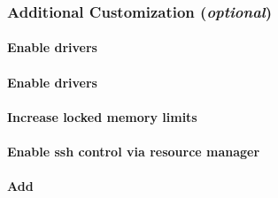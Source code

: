 \documentclass[letterpaper]{article}
\begin{document}



\subsubsection{Additional Customization ({\em optional})} \label{sec:addl_customizations}


\paragraph{Enable \InfiniBand{} drivers}


\paragraph{Enable \OmniPath{} drivers}


\paragraph{Increase locked memory limits}
 

\paragraph{Enable ssh control via resource manager} 


\vspace*{0.5cm}
\paragraph{Add \beegfs{}} \label{sec:add_beegfs}

\end{document}
